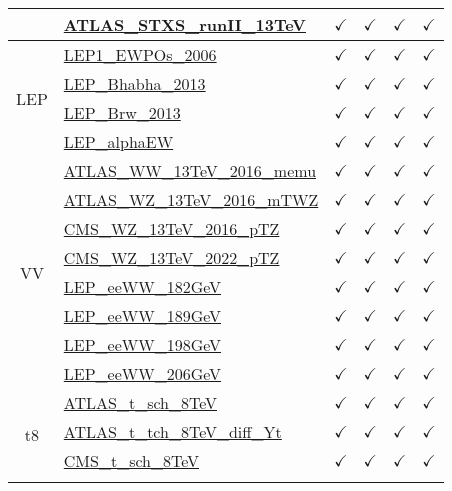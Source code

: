 \documentclass{article}
\begin{document}
\begin{longtable}{|c|l|c|c|c|c|}
 & \href{https://arxiv.org}{ATLAS_STXS_runII_13TeV}  & $\checkmark$ & $\checkmark$ & $\checkmark$ & $\checkmark$
\\ \hline
\multirow{4}{*}{LEP}
 & \href{https://arxiv.org}{LEP1_EWPOs_2006}  & $\checkmark$ & $\checkmark$ & $\checkmark$ & $\checkmark$\\ \cline{2-6}
 & \href{https://arxiv.org}{LEP_Bhabha_2013}  & $\checkmark$ & $\checkmark$ & $\checkmark$ & $\checkmark$\\ \cline{2-6}
 & \href{https://arxiv.org}{LEP_Brw_2013}  & $\checkmark$ & $\checkmark$ & $\checkmark$ & $\checkmark$\\ \cline{2-6}
 & \href{https://arxiv.org}{LEP_alphaEW}  & $\checkmark$ & $\checkmark$ & $\checkmark$ & $\checkmark$
\\ \hline
\multirow{8}{*}{VV}
 & \href{https://arxiv.org}{ATLAS_WW_13TeV_2016_memu}  & $\checkmark$ & $\checkmark$ & $\checkmark$ & $\checkmark$\\ \cline{2-6}
 & \href{https://arxiv.org}{ATLAS_WZ_13TeV_2016_mTWZ}  & $\checkmark$ & $\checkmark$ & $\checkmark$ & $\checkmark$\\ \cline{2-6}
 & \href{https://arxiv.org}{CMS_WZ_13TeV_2016_pTZ}  & $\checkmark$ & $\checkmark$ & $\checkmark$ & $\checkmark$\\ \cline{2-6}
 & \href{https://arxiv.org}{CMS_WZ_13TeV_2022_pTZ}  & $\checkmark$ & $\checkmark$ & $\checkmark$ & $\checkmark$\\ \cline{2-6}
 & \href{https://arxiv.org}{LEP_eeWW_182GeV}  & $\checkmark$ & $\checkmark$ & $\checkmark$ & $\checkmark$\\ \cline{2-6}
 & \href{https://arxiv.org}{LEP_eeWW_189GeV}  & $\checkmark$ & $\checkmark$ & $\checkmark$ & $\checkmark$\\ \cline{2-6}
 & \href{https://arxiv.org}{LEP_eeWW_198GeV}  & $\checkmark$ & $\checkmark$ & $\checkmark$ & $\checkmark$\\ \cline{2-6}
 & \href{https://arxiv.org}{LEP_eeWW_206GeV}  & $\checkmark$ & $\checkmark$ & $\checkmark$ & $\checkmark$
\\ \hline
\multirow{10}{*}{t8}
 & \href{https://arxiv.org}{ATLAS_t_sch_8TeV}  & $\checkmark$ & $\checkmark$ & $\checkmark$ & $\checkmark$\\ \cline{2-6}
 & \href{https://arxiv.org}{ATLAS_t_tch_8TeV_diff_Yt}  & $\checkmark$ & $\checkmark$ & $\checkmark$ & $\checkmark$\\ \cline{2-6}
 & \href{https://arxiv.org}{CMS_t_sch_8TeV}  & $\checkmark$ & $\checkmark$ & $\checkmark$ & $\checkmark$\\ \cline{2-6}

\end{longtable}
\end{document}
